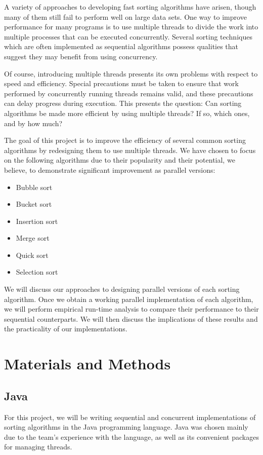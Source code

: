 \documentclass{article}
\begin{document}
A variety of approaches to developing fast sorting algorithms have arisen, though many of them still fail to perform well on large data sets. One way to improve performance for many programs is to use multiple threads to divide the work into multiple processes that can be executed concurrently. Several sorting techniques which are often implemented as sequential algorithms possess qualities that suggest they may benefit from using concurrency.

Of course, introducing multiple threads presents its own problems with respect to speed and efficiency. Special precautions must be taken to ensure that work performed by concurrently running threads remains valid, and these precautions can delay progress during execution. This presents the question: Can sorting algorithms be made more efficient by using multiple threads? If so, which ones, and by how much?

The goal of this project is to improve the efficiency of several common sorting algorithms by redesigning them to use multiple threads. We have chosen to focus on the following algorithms due to their popularity and their potential, we believe, to demonstrate significant improvement as parallel versions:
\begin{itemize}
  \item Bubble sort
  \item Bucket sort
  \item Insertion sort
  \item Merge sort
  \item Quick sort
  \item Selection sort
\end{itemize}
We will discuss our approaches to designing parallel versions of each sorting algorithm. Once we obtain a working parallel implementation of each algorithm, we will perform empirical run-time analysis to compare their performance to their sequential counterparts. We will then discuss the implications of these results and the practicality of our implementations.

\section{Materials and Methods}
\subsection{Java}
For this project, we will be writing sequential and concurrent implementations of sorting algorithms in the Java programming language. Java was chosen mainly due to the team's experience with the language, as well as its convenient packages for managing threads.
\end{document}
